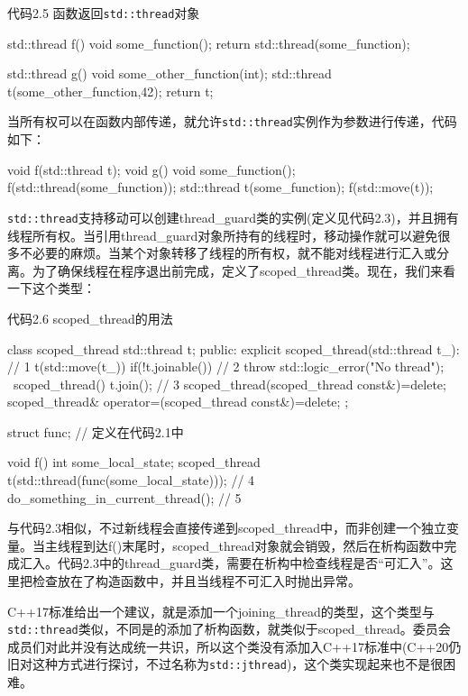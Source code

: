 代码2.5 函数返回\texttt{std::thread}对象

\begin{cpp}
std::thread f()
{
  void some_function();
  return std::thread(some_function);
}

std::thread g()
{
  void some_other_function(int);
  std::thread t(some_other_function,42);
  return t;
}
\end{cpp}

当所有权可以在函数内部传递，就允许\texttt{std::thread}实例作为参数进行传递，代码如下：

\begin{cpp}
void f(std::thread t);
void g()
{
  void some_function();
  f(std::thread(some_function));
  std::thread t(some_function);
  f(std::move(t));
}
\end{cpp}

\texttt{std::thread}支持移动可以创建thread\_guard类的实例(定义见代码2.3)，并且拥有线程所有权。当引用thread\_guard对象所持有的线程时，移动操作就可以避免很多不必要的麻烦。当某个对象转移了线程的所有权，就不能对线程进行汇入或分离。为了确保线程在程序退出前完成，定义了scoped\_thread类。现在，我们来看一下这个类型：

代码2.6 scoped\_thread的用法

\begin{cpp}
class scoped_thread
{
  std::thread t;
public:
  explicit scoped_thread(std::thread t_): // 1
    t(std::move(t_))
  {
    if(!t.joinable())  // 2
      throw std::logic_error("No thread");
  }
  ~scoped_thread()
  {
    t.join(); // 3
  }
  scoped_thread(scoped_thread const&)=delete;
  scoped_thread& operator=(scoped_thread const&)=delete;
};

struct func; // 定义在代码2.1中

void f()
{
  int some_local_state;
  scoped_thread t(std::thread(func(some_local_state)));    // 4
  do_something_in_current_thread();
} // 5
\end{cpp}

与代码2.3相似，不过新线程会直接传递到scoped\_thread中，而非创建一个独立变量。当主线程到达f()末尾时，scoped\_thread对象就会销毁，然后在析构函数中完成汇入。代码2.3中的thread\_guard类，需要在析构中检查线程是否“可汇入”。这里把检查放在了构造函数中，并且当线程不可汇入时抛出异常。

C++17标准给出一个建议，就是添加一个joining\_thread的类型，这个类型与\texttt{std::thread}类似，不同是的添加了析构函数，就类似于scoped\_thread。委员会成员们对此并没有达成统一共识，所以这个类没有添加入C++17标准中(C++20仍旧对这种方式进行探讨，不过名称为\texttt{std::jthread})，这个类实现起来也不是很困难。

